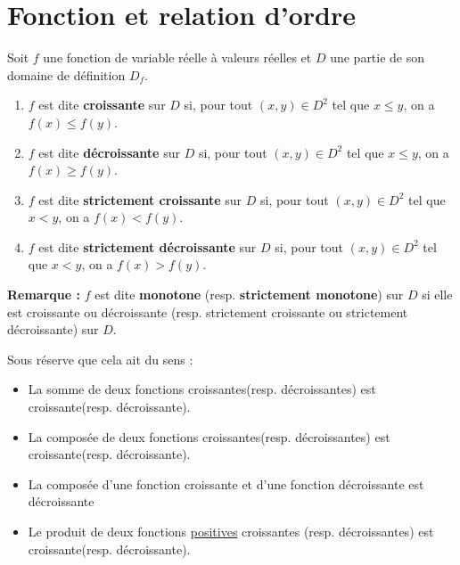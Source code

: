 \section{Fonction et relation d'ordre}
\begin{defi}[Monotonie]
	Soit \(f\) une fonction de variable réelle à valeurs réelles et \(D\) une partie de son domaine de définition \(D_f\).
	\begin{enumerate}
		\item \(f\) est dite \textbf{croissante} sur \(D\) si, pour tout \((x, y) \in D^2\) tel que \(x \leq y\), on a \(f(x) \leq f(y)\).
		\item \(f\) est dite \textbf{décroissante} sur \(D\) si, pour tout \((x, y) \in D^2\) tel que \(x \leq y\), on a \(f(x) \geq f(y)\).
		\item \(f\) est dite \textbf{strictement croissante} sur \(D\) si, pour tout \((x, y) \in D^2\) tel que \(x < y\), on a \(f(x) < f(y)\).
		\item \(f\) est dite \textbf{strictement décroissante} sur \(D\) si, pour tout \((x, y) \in D^2\) tel que \(x < y\), on a \(f(x) > f(y)\).
	\end{enumerate}
	\textbf{Remarque :} \(f\) est dite \textbf{monotone} (resp. \textbf{strictement monotone}) sur \(D\) si elle est croissante ou décroissante (resp. strictement croissante ou strictement décroissante) sur \(D\).
\end{defi}

\begin{rem}
	Sous réserve que cela ait du sens :
	\begin{itemize}
		\item La somme de deux fonctions croissantes(resp. décroissantes) est croissante(resp. décroissante).
		\item La composée de deux fonctions croissantes(resp. décroissantes) est croissante(resp. décroissante).
		\item La composée d'une fonction croissante et d'une fonction décroissante est décroissante
		\item Le produit de deux fonctions \underline{positives} croissantes (resp. décroissantes) est croissante(resp. décroissante).
	\end{itemize}
\end{rem}


